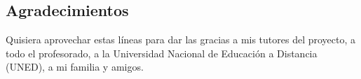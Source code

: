 \begin{flushright}
\section*{Agradecimientos}

Quisiera aprovechar estas líneas para dar las gracias a mis tutores del proyecto, a todo el profesorado, a la Universidad Nacional de Educación a Distancia (UNED), a mi familia y amigos.




\par\end{flushright}    

